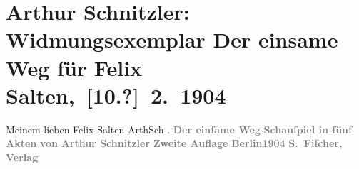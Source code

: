 

         
         \renewcommand{\erwaehntePersonen}{Personen: Felix Salten}
         \renewcommand{\erwaehnteInstitutionen}{Institutionen: S. Fischer Verlag}
         \renewcommand{\erwaehnteOrte}{Orte: Berlin, Wien}
         \renewcommand{\erwaehnteWerke}{Werke: Der einsame Weg. Schauspiel in fünf Akten}
               \section[ Arthur Schnitzler: Widmungsexemplar Der einsame Weg für Felix Salten, {[}10.?{]} 2. 1904]{ Arthur Schnitzler: Widmungsexemplar Der einsame Weg für Felix
               Salten, {[}10.?{]} 2. 1904}\nopagebreak{}\rehead{ }\begin{ledgroupsized}[t]{13cm}\normalsize\beginnumbering \toendnotes[C]{\smallbreak\pagebreak[2]} 
\toendnotes[C]{\smallbreak}\pstart
           \noindent{}{\pb}Meinem lieben Felix Salten\pend
           \pstart \spacefill\mbox{ArthSch}\pend{}\pstart
           \label{K_L03604-1v}\label{K_L03604-1h}.\pend
           {\bigskip}\pstart
           \noindent{}\centering{}{\pb}\textcolor{gray}{\textbf{\textbf{Der einſame Weg}}}\pend
           \pstart
           \noindent{}\centering{}\textcolor{gray}{\textbf{Schauſpiel in fünf Akten}}\pend
           \pstart
           \noindent{}\centering{}\textcolor{gray}{\textbf{von}}\pend
           \pstart
           \noindent{}\centering{}\textcolor{gray}{\textbf{\textbf{Arthur Schnitzler}}}\pend
           {\bigskip}\pstart
           \noindent{}\centering{}\textcolor{gray}{\textbf{Zweite Auflage}}\pend
           {\bigskip}\pstart
           \noindent{}\centering{}\textcolor{gray}{\textbf{Berlin1904}}\pend
           \pstart
           \noindent{}\centering{}\textcolor{gray}{\textbf{S. Fiſcher, Verlag}}\pend
           
         
         \endnumbering{}\end{ledgroupsized}  \newcommand{\dateiname}{L03604}\newcommand{\titel}{Arthur Schnitzler: Widmungsexemplar Der einsame Weg für Felix Salten, [10.?] 2. 1904}\newcommand{\editorInnen}{Martin Anton Müller und Laura Untner}
      